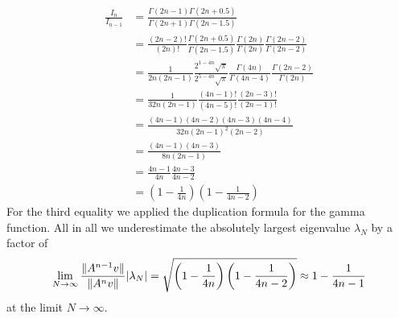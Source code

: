 \documentclass{scrartcl}
\DeclarePairedDelimiter\abs{\lvert}{\rvert}%
\DeclarePairedDelimiter\norm{\lVert}{\rVert}%
\begin{document}
\begin{align*}
	\frac{I_n}{I_{n-1}} &= 
	\frac{\Gamma(2n - 1)\Gamma(2n + 0.5)}{\Gamma(2n + 1)\Gamma(2n - 1.5)} \\&=   
	\frac{(2n - 2)!}{(2n)!}
	\frac{\Gamma(2n + 0.5)}{\Gamma(2n - 1.5)}
	\frac{\Gamma(2n)}{\Gamma(2n)}
	\frac{\Gamma(2n-2)}{\Gamma(2n-2)} \\&=
	\frac{1}{2n(2n-1)} 
	\frac{2^{1-4n}\sqrt\pi}{2^{5-4n}\sqrt\pi}
	\frac{\Gamma(4n)}{\Gamma(4n-4)}
	\frac{\Gamma(2n-2)}{\Gamma(2n)} \\&=
	\frac{1}{32n(2n-1)} 
	\frac{(4n-1)!}{(4n-5)!}
	\frac{(2n-3)!}{(2n-1)!} \\&=
	\frac{(4n-1)(4n-2)(4n-3)(4n-4)}{32n(2n-1)^2(2n-2)} \\&=
	\frac{(4n-1)(4n-3)}{8n(2n-1)} \\&=
	\frac{4n-1}{4n}\frac{4n-3}{4n-2} \\&=
	\left(1-\frac{1}{4n}\right)\left(1-\frac{1}{4n-2}\right)
\end{align*}
For the third equality we applied the duplication formula for the gamma function. All in all we underestimate the absolutely largest eigenvalue $\lambda_N$ by a factor of 
\[
	\lim_{N\to\infty}\frac{\norm{A^{n-1}v}}{\norm{A^{n}v}}\abs{\lambda_N} =
	\sqrt{\left(1-\frac{1}{4n}\right)\left(1-\frac{1}{4n-2}\right)} \approx
	1-\frac{1}{4n-1}
\]
at the limit $N\to\infty$. 
\end{document}
